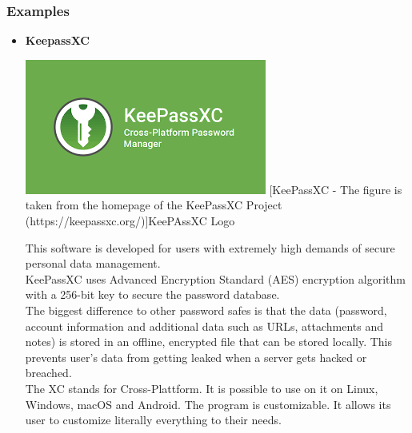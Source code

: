 \documentclass[conference]{IEEEtran}
\begin{document}
\subsubsection{Examples}
\begin{itemize}
\item \textbf{KeepassXC}\cite{b6}\\ 
\begin{center}
\includegraphics[scale=0.6]{./images/KeePass.png}
[KeePassXC - The figure is taken from the homepage of the KeePassXC Project (https://keepassxc.org/)]{KeePAssXC Logo}
\end{center}

This software is developed for users with extremely high demands of secure personal data management. \\
KeePassXC uses Advanced Encryption Standard (AES) encryption algorithm with a 256-bit key to secure the password database.\\
The biggest difference to other password safes is that the data (password, account information and additional data such as URLs, attachments and notes) is stored in an offline, encrypted file that can be stored locally. This prevents user's data from getting leaked when a server gets hacked or breached.\\
The XC stands for Cross-Plattform. It is possible to use on it on Linux, Windows, macOS and Android.
The program is customizable. It allows its user to customize literally everything to their needs.\\



\end{itemize}
\end{document}
